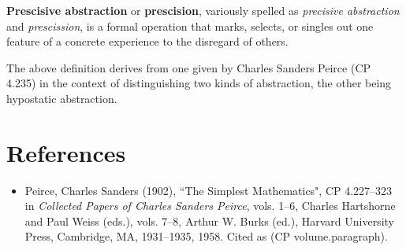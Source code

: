 \documentclass[12pt]{article}
\begin{document}
\textbf{Prescisive abstraction} or \textbf{prescision}, variously spelled as \textit{precisive abstraction} and \textit{prescission}, is a formal operation that marks, selects, or singles out one feature of a concrete experience to the disregard of others.

The above definition derives from one given by Charles Sanders Peirce (CP 4.235) in the context of distinguishing two kinds of abstraction, the other being hypostatic abstraction.

\section{References}

\begin{itemize}
\item
Peirce, Charles Sanders (1902), ``The Simplest Mathematics", CP 4.227--323 in \textit{Collected Papers of Charles Sanders Peirce}, vols. 1--6, Charles Hartshorne and Paul Weiss (eds.), vols. 7--8, Arthur W. Burks (ed.), Harvard University Press, Cambridge, MA, 1931--1935, 1958.  Cited as (CP volume.paragraph).
\end{itemize}

\end{document}

